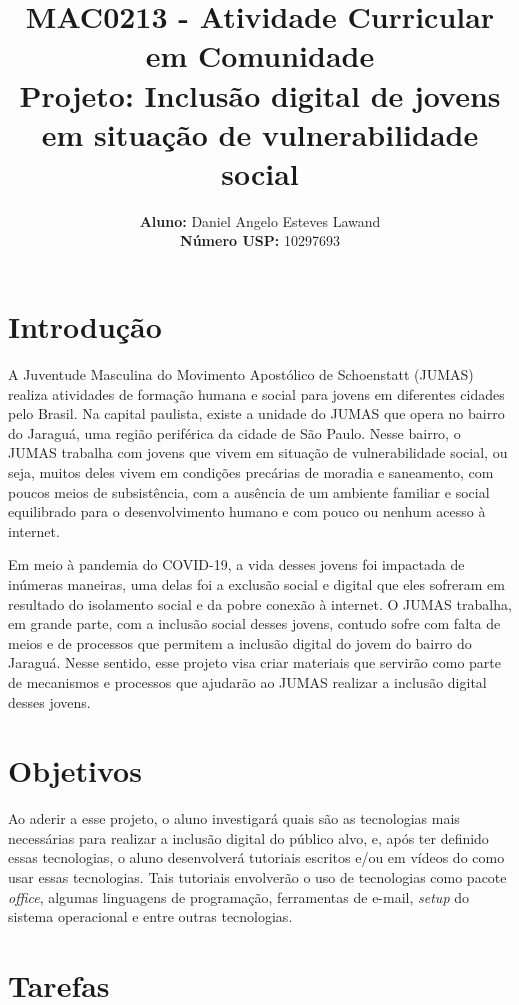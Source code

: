 \documentclass{article}
\title{\textbf{MAC0213 - Atividade Curricular em Comunidade \\ Projeto: Inclusão digital de jovens em situação de vulnerabilidade social}}
\author{
    \textbf{Aluno:} Daniel Angelo Esteves Lawand  \\
    \textbf{Número USP:} 10297693
    }
\date{}
\begin{document}
\maketitle

\section{Introdução}

A Juventude Masculina do Movimento Apostólico de Schoenstatt (JUMAS) realiza atividades de formação humana e social para jovens em diferentes cidades pelo Brasil. Na capital paulista, existe a unidade do JUMAS que opera no bairro do Jaraguá, uma região periférica da cidade de São Paulo. Nesse bairro, o JUMAS trabalha com jovens que vivem em situação de vulnerabilidade social, ou seja, muitos deles vivem em condições precárias de moradia e saneamento, com poucos meios de subsistência, com a ausência de um ambiente familiar e social equilibrado para o desenvolvimento humano e com pouco ou nenhum acesso à internet.

Em meio à pandemia do COVID-19, a vida desses jovens foi impactada de inúmeras maneiras, uma delas foi a exclusão social e digital que eles sofreram em resultado do isolamento social e da pobre conexão à internet. O JUMAS trabalha, em grande parte, com a inclusão social desses jovens, contudo sofre com falta de meios e de processos que permitem a inclusão digital do jovem do bairro do Jaraguá. Nesse sentido, esse projeto visa criar materiais que servirão como parte de mecanismos e processos que ajudarão ao JUMAS realizar a inclusão digital desses jovens.

\section{Objetivos}

Ao aderir a esse projeto, o aluno investigará quais são as tecnologias mais necessárias para realizar a inclusão digital do público alvo, e, após ter definido essas tecnologias, o aluno desenvolverá tutoriais escritos e/ou em vídeos do como usar essas tecnologias. Tais tutoriais envolverão o uso de tecnologias como pacote \textit{office}, algumas linguagens de programação, ferramentas de e-mail, \textit{setup} do sistema operacional e entre outras tecnologias. 

\section{Tarefas}
\end{document}
